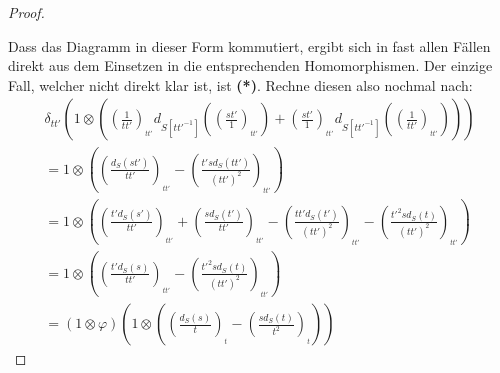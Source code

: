 \documentclass[10pt,a4paper]{report}
\newcommand{\comment}[1]{}
\newcommand{\divf}[1]{d_{#1}}
\newcommand{\tensor}[3]{#1 \otimes #3}
\newcommand{\lok}[2]{#1 [#2^{-1}]}
\newcommand{\loke}[3]{(\frac{#1}{#2})_{_{#3}}}
\begin{document}
\begin{proof}
\begin{center}
\end{center}
Dass das Diagramm in dieser Form kommutiert, ergibt sich in fast allen Fällen direkt aus dem Einsetzen in die entsprechenden Homomorphismen. Der einzige Fall, welcher nicht direkt klar ist, ist \textbf{(*)}. Rechne diesen also nochmal nach:
\begin{gather*}
\delta_{tt'}( \tensor{1}{\lok{S}{tt'}}{( \loke{1}{tt'}{tt'}\divf{\lok{S}{tt'}}(\loke{st'}{1}{tt'}) + \loke{st'}{1}{tt'}\divf{\lok{S}{tt'}}(\loke{1}{tt'}{tt'}))} )\\
= \tensor{1}{\lok{S}{tt'}}{( \loke{\divf{S}(st')}{tt'}{tt'} - \loke{t's\divf{S}(tt')}{(tt')^2}{tt'} )} \\
= \tensor{1}{\lok{S}{tt'}}{( \loke{t'\divf{S}(s')}{tt'}{tt'} + \loke{s\divf{S}(t')}{tt'}{tt'} 
- \loke{tt'\divf{S}(t')}{(tt')^2}{tt'} - \loke{t'^2s\divf{S}(t)}{(tt')^2}{tt'} )} \\
\comment{ = \tensor{1}{\lok{S}{tt'}}{( \loke{t'\divf{S}(s)}{tt'}{tt'} + \loke{s\divf{S}(t')}{tt'}{tt'} - \loke{s\divf{S}(tt')}{tt'}{tt'} - \loke{t'^2s\divf{S}(t)}{(tt')^2}{tt'} )} \\ }
= \tensor{1}{ \lok{S}{tt'}}{( \loke{t'\divf{S}(s)}{tt'}{tt'} - \loke{t'^2s\divf{S}(t)}{(tt')^2}{tt' } )} \\
= (\tensor{1}{\lok{S}{t}}{\varphi})(\tensor{1}{\lok{S}{t}}{( \loke{\divf{S}(s)}{t}{t} - \loke{s\divf{S}(t)}{t^2}{t}  )})
\end{gather*}
\comment{Damit haben wir einen zu $\mathcal{F}$ isomorphen Funktor gefunden:
\begin{gather*}

\end{gather*}}
\end{proof}
\end{document}
